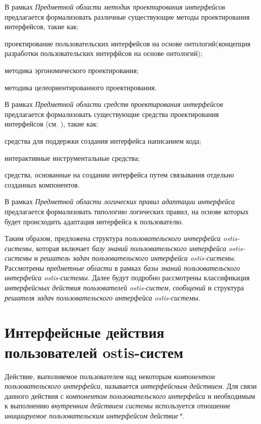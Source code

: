 \bigskip

В рамках \textit{Предметной области методик проектирования интерфейсов} предлагается формализовать различные существующие методы проектирования интерфейсов, такие как:
\begin{textitemize}
	\item проектирование пользовательских интерфейсов на основе онтологий(концепция разработки пользовательских интерфйсов на основе онтологий);
	\item методика эргономического проектирования;
	\item методика целеориентированного проектирования.
\end{textitemize}

В рамках \textit{Предметной области средств проектирования интерфейсов} предлагается формализовать существующие средства проектирования интерфейсов (см. ), такие как:
\begin{textitemize}
	\item средства для поддержки создания интерфейса написанием кода;
	\item интерактивные инструментальные средства;
	\item средства, основанные на создании интерфейса путем связывания отдельно созданных компонентов.
\end{textitemize}

В рамках \textit{Предметной области логических правил адаптации интерфейса} предлагается формализовать типологию логических правил, на основе которых будет происходить адаптация интерфейса к пользователю.

Таким образом, предложена структура \textit{пользовательского интерфейса ostis-системы}, которая включает \textit{базу знаний пользовательского интерфейса ostis-системы} и \textit{решатель задач пользовательского интерфейса ostis-системы}. Рассмотрены \textit{предметные области} в рамках \textit{базы знаний пользовательского интерфейса ostis-системы}. Далее будут подробно рассмотрены классификация \textit{интерфейсных действия пользователей ostis-систем}, \textit{сообщений} и структура \textit{решателя задач пользовательского интерфейса ostis-системы}.

\section{Интерфейсные действия пользователей ostis-систем}
\label{sec_interface_user_actions}


Действие, выполняемое пользователем над некоторым \textit{компонентом пользовательского интерфейса}, называется \textit{интерфейсным действием}. Для связи данного действия с \textit{компонентом пользовательского интерфейса} и необходимым к выполнению \textit{внутренним действием системы} используется отношение \textit{инициируемое пользовательским интерфейсом действие*}.

